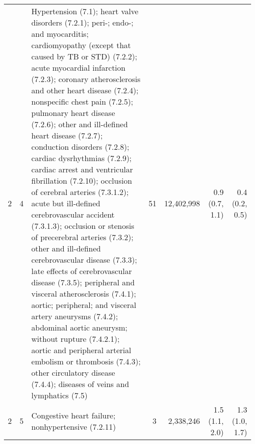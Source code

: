 \begin{tabular}{llp{6.5cm}rrrr}
   2 &  4 & Hypertension (7.1); heart valve disorders (7.2.1); peri-; endo-; and myocarditis; cardiomyopathy (except that caused by TB or STD) (7.2.2); acute myocardial infarction (7.2.3); coronary atherosclerosis and other heart disease (7.2.4); nonspecific chest pain (7.2.5); pulmonary heart disease (7.2.6); other and ill-defined heart disease (7.2.7); conduction disorders (7.2.8); cardiac dysrhythmias (7.2.9); cardiac arrest and ventricular fibrillation (7.2.10); occlusion of cerebral arteries (7.3.1.2); acute but ill-defined cerebrovascular accident (7.3.1.3); occlusion or stenosis of precerebral arteries (7.3.2); other and ill-defined cerebrovascular disease (7.3.3); late effects of cerebrovascular disease (7.3.5); peripheral and visceral atherosclerosis (7.4.1); aortic; peripheral; and visceral artery aneurysms (7.4.2); abdominal aortic aneurysm; without rupture (7.4.2.1); aortic and peripheral arterial embolism or thrombosis (7.4.3); other circulatory disease (7.4.4); diseases of veins and lymphatics (7.5) & 51 & 12,402,998 & 0.9 (0.7, 1.1) & 0.4 (0.2, 0.5) \\ 
   2 &  5 & Congestive heart failure; nonhypertensive (7.2.11) &  3 & 2,338,246 & 1.5 (1.1, 2.0) & 1.3 (1.0, 1.7) \\ 
   \hline
\end{tabular}

